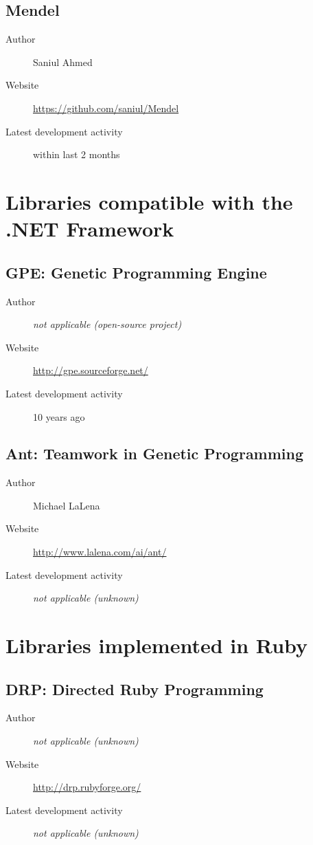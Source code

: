 \subsection*{Mendel}
\begin{description}
    \item[Author] Saniul Ahmed
    \item[Website] \url{https://github.com/saniul/Mendel}
    \item[Latest development activity] within last 2 months
\end{description}


\section{Libraries compatible with the .NET Framework}
\subsection*{GPE: Genetic Programming Engine}
\begin{description}
    \item[Author] \textit{not applicable (open-source project)}
    \item[Website] \url{http://gpe.sourceforge.net/}
    \item[Latest development activity] 10 years ago
\end{description}


\subsection*{Ant: Teamwork in Genetic Programming}
\begin{description}
    \item[Author] Michael LaLena
    \item[Website] \url{http://www.lalena.com/ai/ant/}
    \item[Latest development activity] \textit{not applicable (unknown)}
\end{description}


\section{Libraries implemented in Ruby}
\subsection*{DRP: Directed Ruby Programming}
\begin{description}
    \item[Author] \textit{not applicable (unknown)}
    \item[Website] \url{http://drp.rubyforge.org/}
    \item[Latest development activity] \textit{not applicable (unknown)}
\end{description}


